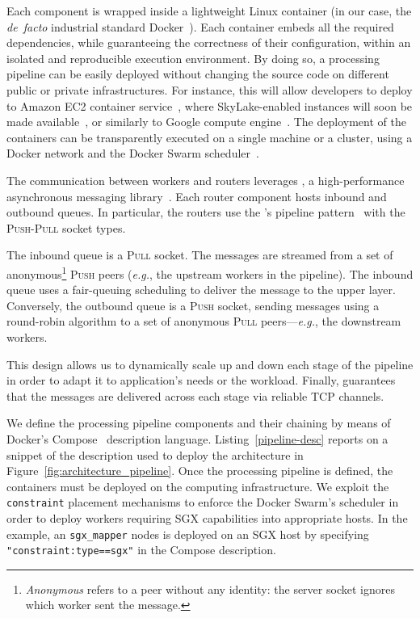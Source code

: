Each component is wrapped inside a lightweight Linux container (in our case, the \emph{de~facto} industrial standard Docker~\cite{docker}).
Each container embeds all the required dependencies, while guaranteeing the correctness of their configuration, within an isolated and reproducible execution environment.
By doing so, a \SYS{} processing pipeline can be easily deployed without changing the source code on different public or private infrastructures.
For instance, this will allow developers to deploy \SYS{} to Amazon EC2 container service~\cite{awsec2container}, where SkyLake-enabled instances will soon be made available~\cite{amazonskylake}, or similarly to Google compute engine~\cite{gceskylake}.
The deployment of the containers can be transparently executed on a single machine or a cluster, using a Docker network and the Docker Swarm scheduler~\cite{docker:swarm_2016}.

The communication between workers and routers leverages \zmq{}, a high-performance asynchronous messaging library~\cite{zero_mq}.
Each router component hosts inbound and outbound queues.
In particular, the routers use the \zmq's pipeline pattern~\cite{zero_mq:pipeline} with the \textsc{Push}-\textsc{Pull} socket types.

The inbound queue is a \textsc{Pull} socket.
The messages are streamed from a set of anonymous\footnote{\emph{Anonymous} refers to a peer without any identity: the server socket ignores which worker sent the message.} \textsc{Push} peers (\emph{e.g.}, the upstream workers in the pipeline).
The inbound queue uses a fair-queuing scheduling to deliver the message to the upper layer.
Conversely, the outbound queue is a \textsc{Push} socket, sending messages using a round-robin algorithm to a set of anonymous \textsc{Pull} peers---\emph{e.g.}, the downstream workers.

This design allows us to dynamically scale up and down each stage of the pipeline in order to adapt it to application's needs or the workload.
Finally, \zmq{} guarantees that the messages are delivered across each stage via reliable TCP channels.

We define the processing pipeline components and their chaining by means of Docker's Compose~\cite{docker:compose} description language.
Listing~\ref{pipeline-desc} reports on a snippet of the description used to deploy the architecture in Figure~\ref{fig:architecture_pipeline}.
Once the processing pipeline is defined, the containers must be deployed on the computing infrastructure.
We exploit the \texttt{constraint} placement mechanisms to enforce the Docker Swarm's scheduler in order to deploy workers requiring SGX capabilities into appropriate hosts.
In the example, an \texttt{sgx\_mapper} nodes is deployed on an SGX host by specifying \texttt{"constraint:type==sgx"} in the Compose description.

